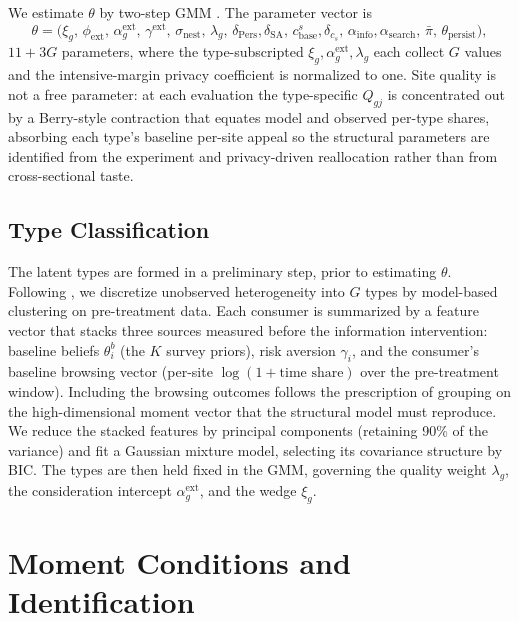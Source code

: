 \documentclass[12pt]{article}
\theoremstyle{definition}
\theoremstyle{remark}
\begin{document}
We estimate $\theta$ by two-step GMM \citep{hansen1982large}. The parameter vector is
\begin{equation*}
  \theta = \bigl(\xi_g,\, \phi_{\text{ext}},\, \alpha^{\text{ext}}_g,\, \gamma^{\text{ext}},\, \sigma_{\text{nest}},\, \lambda_g,\, \delta_{\text{Pers}}, \delta_{\text{SA}},\, c^s_{\text{base}}, \delta_{c_s},\, \alpha_{\text{info}}, \alpha_{\text{search}},\, \bar\pi,\, \theta_{\text{persist}}\bigr),
\end{equation*}
$11 + 3G$ parameters, where the type-subscripted $\xi_g, \alpha^{\text{ext}}_g, \lambda_g$ each collect $G$ values and the intensive-margin privacy coefficient is normalized to one. Site quality is not a free parameter: at each evaluation the type-specific $Q_{gj}$ is concentrated out by a Berry-style contraction \citep{berry1994estimating} that equates model and observed per-type shares, absorbing each type's baseline per-site appeal so the structural parameters are identified from the experiment and privacy-driven reallocation rather than from cross-sectional taste.

\subsection{Type Classification}

The latent types are formed in a preliminary step, prior to estimating $\theta$. Following \citet{bonhomme2022}, we discretize unobserved heterogeneity into $G$ types by model-based clustering on pre-treatment data. Each consumer is summarized by a feature vector that stacks three sources measured before the information intervention: baseline beliefs $\theta^b_i$ (the $K$ survey priors), risk aversion $\gamma_i$, and the consumer's baseline browsing vector (per-site $\log(1+\text{time share})$ over the pre-treatment window). Including the browsing outcomes follows the \citet{bonhomme2022} prescription of grouping on the high-dimensional moment vector that the structural model must reproduce. We reduce the stacked features by principal components (retaining 90\% of the variance) and fit a Gaussian mixture model, selecting its covariance structure by BIC. The types are then held fixed in the GMM, governing the quality weight $\lambda_g$, the consideration intercept $\alpha^{\text{ext}}_g$, and the wedge $\xi_g$.

\section{Moment Conditions and Identification}\label{sec:identification}\label{sec:em_moments}
\end{document}
